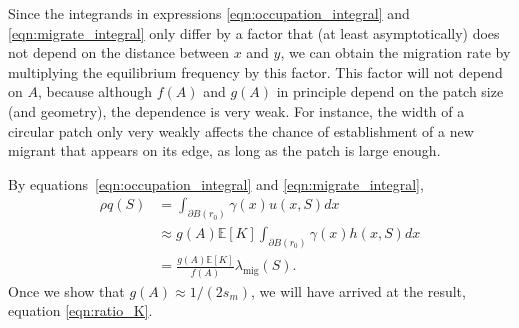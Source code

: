 \documentclass{article}
\newcommand{\E}{\mathbb{E}}
\newcommand{\migrate}{\lambda_\text{mig}}
\begin{document}
Since the integrands in expressions \eqref{eqn:occupation_integral} and \eqref{eqn:migrate_integral} only differ by a factor
that (at least asymptotically) does not depend on the distance between $x$ and $y$,
we can obtain the migration rate by multiplying the equilibrium frequency by this factor.
This factor will not depend on $A$, 
because although $f(A)$ and $g(A)$ in principle depend on the patch size (and geometry),
the dependence is very weak.
For instance, the width of a circular patch only very weakly affects the chance 
of establishment of a new migrant that appears on its edge,
as long as the patch is large enough.

By equations~\eqref{eqn:occupation_integral} and \eqref{eqn:migrate_integral},
\begin{align}
    \rho q(S)  &= \int_{\partial B(r_0)} \gamma(x) u(x,S) dx  \\
          &\approx g(A) \E[K] \int_{\partial B(r_0)} \gamma(x) h(x,S) dx \\
          &= \frac{ g(A) \E[K] }{ f(A) } \migrate(S) . \label{eqn:q_migrate_relation}
\end{align}
Once we show that $g(A) \approx 1/(2 s_m)$, 
we will have arrived at the result, equation \eqref{eqn:ratio_K}.
\end{document}
